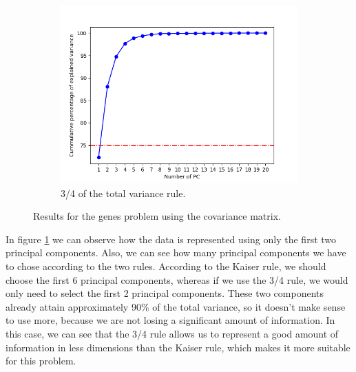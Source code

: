 \documentclass[11pt,a4paper]{article}
\begin{document}
\begin{figure}[H]
\begin{subfigure}[t]{.5\textwidth}
    \includegraphics[scale=0.4]{img/pc_genes_variance}
    \caption{3/4 of the total variance rule.}
  \end{subfigure}
  \caption{Results for the genes problem using the covariance matrix.}
  \label{fig:pc-genes}
\end{figure}

In figure \ref{fig:pc-genes} we can observe how the data is represented using only the first two
principal components. Also, we can see how many principal components we have to chose according to the
two rules. According to the Kaiser rule, we should choose the first 6 principal components, whereas
if we use the 3/4 rule, we would only need to select the first 2 principal components. These two
components already attain approximately 90\% of the total variance, so it doesn't make sense
to use more, because we are not losing a significant amount of information. In this case, we can see
that the 3/4 rule allows us to represent a good amount of information in less dimensions
than the Kaiser rule, which makes it more suitable for this problem.
\end{document}
